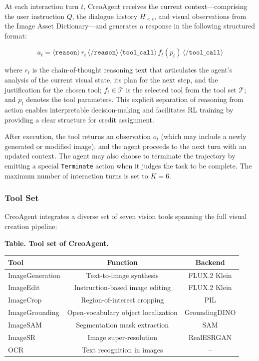 \documentclass{article}
\begin{document}
At each interaction turn $t$, CreoAgent receives the current context—comprising the user instruction $Q$, the dialogue history $H_{<t}$, and visual observations from the Image Asset Dictionary—and generates a response in the following structured format:

$$a_t = \langle \texttt{reason} \rangle \, r_t \, \langle \texttt{/reason} \rangle \, \langle \texttt{tool\_call} \rangle \, f_t(p_t) \, \langle \texttt{/tool\_call} \rangle$$

where $r_t$ is the chain-of-thought reasoning text that articulates the agent's analysis of the current visual state, its plan for the next step, and the justification for the chosen tool; $f_t \in \mathcal{T}$ is the selected tool from the tool set $\mathcal{T}$; and $p_t$ denotes the tool parameters. This explicit separation of reasoning from action enables interpretable decision-making and facilitates RL training by providing a clear structure for credit assignment.

After execution, the tool returns an observation $o_t$ (which may include a newly generated or modified image), and the agent proceeds to the next turn with an updated context. The agent may also choose to terminate the trajectory by emitting a special \texttt{Terminate} action when it judges the task to be complete. The maximum number of interaction turns is set to $K=6$.

\subsubsection{Tool Set}

CreoAgent integrates a diverse set of seven vision tools spanning the full visual creation pipeline:

\textbf{Table. Tool set of CreoAgent.}

\begin{table}[t]
\centering
\begin{tabular}{lcc}
\toprule
\textbf{Tool} & \textbf{Function} & \textbf{Backend} \\
\midrule
ImageGeneration & Text-to-image synthesis & FLUX.2 Klein \\
ImageEdit & Instruction-based image editing & FLUX.2 Klein \\
ImageCrop & Region-of-interest cropping & PIL \\
ImageGrounding & Open-vocabulary object localization & GroundingDINO \\
ImageSAM & Segmentation mask extraction & SAM \\
ImageSR & Image super-resolution & RealESRGAN \\
OCR & Text recognition in images & -- \\
\bottomrule
\end{tabular}
\end{table}
\end{document}
